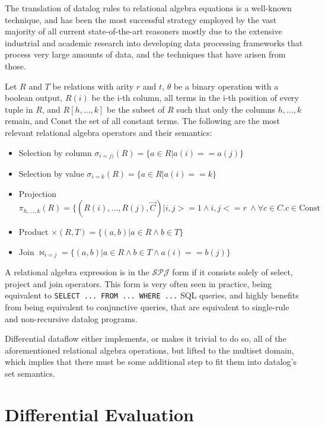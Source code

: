 \documentclass[sigconf,screen,review,natbib]{acmart}
\theoremstyle{definition}
\begin{document}
The translation of datalog rules to relational algebra equations is a well-known technique, and has been
the most successful strategy employed by the vast majority of all current state-of-the-art reasoners\cite{bigdatalog, cog, nexus, recstep, dcdatalog, souffle}
mostly due to the extensive industrial and academic research into developing data processing frameworks
that process very large amounts of data, and the techniques that have arisen from those.

Let $R$ and $T$ be relations with arity $r$ and $t$, $\theta$ be a binary operation with a boolean output, $R(i)$ be
the i-th column, all terms in the i-th position of every tuple in $R$, and $R[h, ..., k]$ be the subset of $R$ such
that only the columns $h, ..., k$ remain, and Const the set of all constant terms. The following are the most
relevant relational algebra operators and their semantics:
\begin{itemize}
	\item Selection by column $\sigma_{i=j)}(R) = \{ a \in R | a(i) == a(j) \}$
	\item Selection by value $\sigma_{i=k}(R) = \{a \in R | a(i) == k \}$
	\item Projection $\pi_{h, ..., k}(R) = \{(R(i), ..., R(j), \overrightarrow{C}) |  i, j >= 1 \wedge i, j <= r\ \wedge \forall c \in C. c \in \text{Const}$
	\item Product $\times(R, T) = \{(a, b) | a \in R \wedge b \in T \}$
	\item Join $\Join_{i=j} = \{(a, b) | a \in R \wedge b \in T \wedge a(i) == b(j)\}$
\end{itemize}

A relational algebra expression is in the $\mathcal{SPJ}$ form if it consists solely of select, project and join
operators. This form is very often seen in practice, being equivalent to \verb|SELECT ... FROM ... WHERE ...| SQL
queries, and highly benefits from being equivalent to conjunctive queries, that are equivalent to single-rule and
non-recursive datalog programs.

Differential dataflow either implements, or makes it trivial to do so, all of the aforementioned relational algebra
operations, but lifted to the multiset domain, which implies that there must be some additional step to fit them
into datalog's set semantics.

\section{Differential Evaluation}
\end{document}
